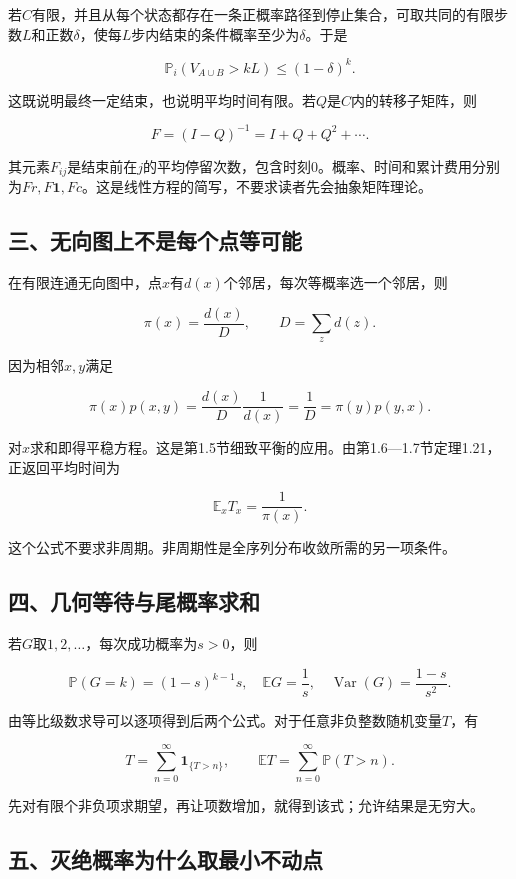 \documentclass[
  11pt,a4paper,UTF8,fontset=fandol]{ctexart}
\begin{document}
若\(C\)有限，并且从每个状态都存在一条正概率路径到停止集合，可取共同的有限步数\(L\)和正数\(\delta\)，使每\(L\)步内结束的条件概率至少为\(\delta\)。于是

\[
\mathbb P_i(V_{A\cup B}>kL)\le(1-\delta)^k.
\]

这既说明最终一定结束，也说明平均时间有限。若\(Q\)是\(C\)内的转移子矩阵，则

\[
F=(I-Q)^{-1}=I+Q+Q^2+\cdots.
\]

其元素\(F_{ij}\)是结束前在\(j\)的平均停留次数，包含时刻0。概率、时间和累计费用分别为\(Fr,F\mathbf1,Fc\)。这是线性方程的简写，不要求读者先会抽象矩阵理论。

\subsection{三、无向图上不是每个点等可能}\label{ux4e09ux65e0ux5411ux56feux4e0aux4e0dux662fux6bcfux4e2aux70b9ux7b49ux53efux80fd}

在有限连通无向图中，点\(x\)有\(d(x)\)个邻居，每次等概率选一个邻居，则

\[
\pi(x)=\frac{d(x)}{D},\qquad D=\sum_zd(z).
\]

因为相邻\(x,y\)满足

\[
\pi(x)p(x,y)=\frac{d(x)}D\frac1{d(x)}=\frac1D=\pi(y)p(y,x).
\]

对\(x\)求和即得平稳方程。这是第1.5节细致平衡的应用。由第1.6---1.7节定理1.21，正返回平均时间为

\[
\mathbb E_xT_x=\frac1{\pi(x)}.
\]

这个公式不要求非周期。非周期性是全序列分布收敛所需的另一项条件。

\subsection{四、几何等待与尾概率求和}\label{ux56dbux51e0ux4f55ux7b49ux5f85ux4e0eux5c3eux6982ux7387ux6c42ux548c}

若\(G\)取\(1,2,\ldots\)，每次成功概率为\(s>0\)，则

\[
\mathbb P(G=k)=(1-s)^{k-1}s,\quad
\mathbb EG=\frac1s,\quad
\operatorname{Var}(G)=\frac{1-s}{s^2}.
\]

由等比级数求导可以逐项得到后两个公式。对于任意非负整数随机变量\(T\)，有

\[
T=\sum_{n=0}^{\infty}\mathbf1_{\{T>n\}},\qquad
\mathbb ET=\sum_{n=0}^{\infty}\mathbb P(T>n).
\]

先对有限个非负项求期望，再让项数增加，就得到该式；允许结果是无穷大。

\subsection{五、灭绝概率为什么取最小不动点}\label{ux4e94ux706dux7eddux6982ux7387ux4e3aux4ec0ux4e48ux53d6ux6700ux5c0fux4e0dux52a8ux70b9}
\end{document}
